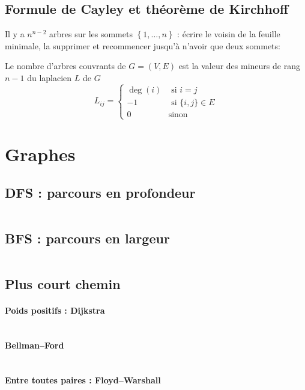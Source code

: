 \documentclass[10pt,twocolumn]{article}
\newcommand{\set}[1]{\left\lbrace #1 \right\rbrace}
\begin{document}
\subsection{Formule de Cayley et théorème de Kirchhoff}
Il y a $n^{n - 2}$ arbres sur les sommets $\set{1, \dots, n}$ : écrire le voisin de la feuille minimale, la supprimer et recommencer jusqu'à n'avoir que deux sommets:

Le nombre d'arbres couvrants de $G = (V, E)$ est la valeur des mineurs de rang $n - 1$ du laplacien $L$ de $G$
$$
    L_{ij} = \left\{\begin{aligned}
        \deg(i) &\text{ si } i = j \\
        -1 &\text{ si } \{i,j\} \in E \\
        0 &\text{sinon}
    \end{aligned}\right.
$$
\section{Graphes}

\subsection{DFS : parcours en profondeur}
\inputminted[breaklines,tabsize=4]{cpp}{code/dfs.cpp}
\subsection{BFS : parcours en largeur}
\inputminted[breaklines,tabsize=4]{cpp}{code/bfs.cpp}

\subsection{Plus court chemin}
\paragraph{Poids positifs : Dijkstra}
\inputminted[breaklines,tabsize=4]{cpp}{code/dijkstra.cpp}
\paragraph{Bellman--Ford}
\inputminted[breaklines,tabsize=4]{cpp}{code/bellmanford.cpp}
\paragraph{Entre toutes paires : Floyd--Warshall}
\inputminted[breaklines,tabsize=4]{cpp}{code/floydwarshall.cpp}
\end{document}
